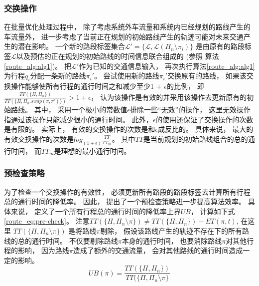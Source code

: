 	\subsubsection*{交换操作}
	在批量优化处理过程中， 除了考虑系统外车流量和系统内已经规划的路线产生的车流量外， 进一步考虑了当前正在规划的初始路线产生的轨迹可能对未来交通产生的潜在影响。 一个新的路段标签集合$\mathcal{L}'=\{\mathcal{L}, \mathcal{L}(\Pi_n\setminus \pi_i)\}$ 是由原有的路段标签$\mathcal{L}$以及预估的正在规划的初始路线的时间信息联合组成的 (参照 算法 \ref{route_alg:alg1})。 把$\mathcal{L}'$作为已知的交通信息输入， 再次执行算法\ref{route_alg:alg1}为行程$q_i$分配一条新的路线$\pi_i'$。 尝试使用新的路线$\pi_i'$交换原有的路线， 如果该交换操作能够使所有行程的通行时间之和减少至少1 + $\epsilon$的比例， 即 $\frac{TT(\{\Pi, \Pi_n\})}{TT(\{\Pi, \Pi_n.swap(\pi,\pi')\})}>1+\epsilon$， 认为该操作是有效的并采用该操作去更新原有的初始路线。 其中， 采用一个极小的常数值$\epsilon$排除一些“无效”的操作， 这里无效操作指通过该操作只能减少很小的通行时间。 此外，$\epsilon$的使用还保证了交换操作的次数是有限的。 实际上， 有效的交换操作的次数是和$\epsilon$成反比的。 具体来说， 最大的有效交换操作的次数是$log_{(1+\epsilon)} \frac{TT}{TT_{m}}$。 其中$TT$是当前规划的初始路线组合的总的通行时间， 而$TT_{m}$是理想的最小通行时间。%

	\subsubsection*{预检查策略}
	为了检查一个交换操作的有效性， 必须更新所有路段的路段标签去计算所有行程总的通行时间的降低率。 因此， 提出了一个预检查策略进一步提高算法效率。 具体来说， 定义了一个所有行程总的通行时间的降低率上界$UB$， 计算如下式\eqref{route_eq:pre-check}。 注意$TT(\{\Pi,\Pi_n \setminus \pi\}) \neq TT(\{\Pi,\Pi_n\})-ET(\pi,t)$, 在这里 $TT(\{\Pi,\Pi_n \setminus \pi\})$ 是将路线$\pi$剔除， 假设该路线产生的轨迹不存在下的所有路线的总的通行时间。 不仅要剔除路线$\pi$本身的通行时间， 也要消除路线$\pi$对其他行程的影响， 因为路线$\pi$造成了额外的交通流量， 会对其他路线的通行时间造成一定的影响。
	\begin{equation}\label{route_eq:pre-check}
	   UB(\pi) = \frac{TT(\{\Pi,\Pi_n\})}{TT(\{\Pi,\Pi_n \setminus \pi\}}
	\end{equation}


